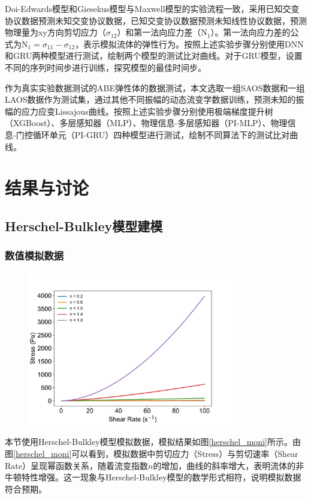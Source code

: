 Doi-Edwards模型和Giesekus模型与Maxwell模型的实验流程一致，采用已知交变协议数据预测未知交变协议数据，已知交变协议数据预测未知线性协议数据，预测物理量为xy方向剪切应力（$\sigma_{12}$）和第一法向应力差（$\text{N}_1$）。第一法向应力差的公式为$\text{N}_1=\sigma_{11}-\sigma_{12} $，表示模拟流体的弹性行为。按照上述实验步骤分别使用DNN和GRU两种模型进行测试，绘制两个模型的测试比对曲线。对于GRU模型，设置不同的序列时间步进行训练，探究模型的最佳时间步。

作为真实实验数据测试的ABE弹性体的数据测试，本文选取一组SAOS数据和一组LAOS数据作为测试集，通过其他不同振幅的动态流变学数据训练，预测未知的振幅的应力应变Lissajous曲线。按照上述实验步骤分别使用极端梯度提升树（XGBoost）、多层感知器（MLP）、物理信息-多层感知器（PI-MLP）、物理信息-门控循环单元（PI-GRU）四种模型进行测试，绘制不同算法下的测试比对曲线。

\section{结果与讨论}
\subsection{Herschel-Bulkley模型建模}
\subsubsection{数值模拟数据}
\begin{figure}[htbp]
  \centering
  \includegraphics[width=0.8\textwidth]{Fig/herschel_moni.pdf}
\end{figure}
本节使用Herschel-Bulkley模型模拟数据，模拟结果如图\ref{herschel_moni}所示。由图\ref{herschel_moni}可以看到，模拟数据中剪切应力（Stress）与剪切速率（Shear Rate）呈现幂函数关系，随着流变指数$n$的增加，曲线的斜率增大，表明流体的非牛顿特性增强。这一现象与Herschel-Bulkley模型的数学形式相符，说明模拟数据符合预期。
